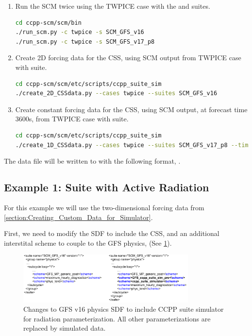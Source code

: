 \begin{enumerate}
\item Run the SCM twice using the TWPICE case with the  and  suites.
\begin{lstlisting}[language=bash]
cd ccpp-scm/scm/bin
./run_scm.py -c twpice -s SCM_GFS_v16
./run_scm.py -c twpice -s SCM_GFS_v17_p8
\end{lstlisting}
\item Create 2D forcing data for the CSS, using SCM output from TWPICE case with  suite.
\begin{lstlisting}[language=bash]
cd ccpp-scm/scm/etc/scripts/ccpp_suite_sim
./create_2D_CSSdata.py --cases twpice --suites SCM_GFS_v16
\end{lstlisting}
\item Create constant forcing data for the CSS, using SCM output, at forecast time 3600s, from TWPICE case with  suite.
\begin{lstlisting}[language=bash]
cd ccpp-scm/scm/etc/scripts/ccpp_suite_sim
./create_1D_CSSdata.py --cases twpice --suites SCM_GFS_v17_p8 --time 3600
\end{lstlisting}
\end{enumerate}

The data file will be written to  with the following format, .

\subsection{Example 1: Suite with Active Radiation}
\label{section:Suite_with_Active_Radiation}

For this example we will use the two-dimensional forcing data from \ref{section:Creating_Custom_Data_for_Simulator}. 

First, we need to modify the SDF to include the CSS,  and an additional interstital scheme to couple to the GFS physics,  (See \ref{fig:CSS_SDF_ex1}).

\begin{figure}[t]
    \centering
    \includegraphics[width=0.80\textwidth]{images/SDF_changes_for_CSS_ex1.png}
    \caption{Changes to GFS v16 physics SDF to include CCPP suite simulator for  radiation parameterization. All other parameterizations are replaced by simulated data.}
    \label{fig:CSS_SDF_ex1}
\end{figure}

